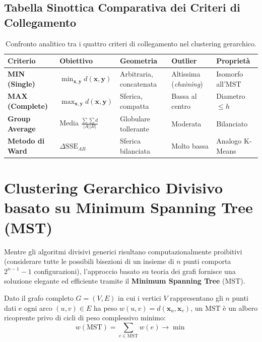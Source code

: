 \FloatBarrier
\subsection{Tabella Sinottica Comparativa dei Criteri di Collegamento}

\begin{table}[H]
\centering
\footnotesize
\renewcommand{\arraystretch}{1.25}
\begin{tabularx}{\textwidth}{p{2.3cm} p{2.2cm} Y Y Y}
\toprule
\textbf{Criterio} & \textbf{Obiettivo} & \textbf{Geometria} & \textbf{Outlier} & \textbf{Proprietà} \\
\midrule
\textbf{MIN (Single)} & $\min_{\mathbf{x}, \mathbf{y}} d(\mathbf{x}, \mathbf{y})$ & Arbitraria, concatenata & Altissima (\textit{chaining}) & Isomorfo all'$\mathrm{MST}$ \\
\textbf{MAX (Complete)} & $\max_{\mathbf{x}, \mathbf{y}} d(\mathbf{x}, \mathbf{y})$ & Sferica, compatta & Bassa al centro & Diametro $\le h$ \\
\textbf{Group Average} & Media $\frac{\sum \sum d}{|A||B|}$ & Globulare tollerante & Moderata & Bilanciato \\
\textbf{Metodo di Ward} & $\Delta\mathrm{SSE}_{AB}$ & Sferica bilanciata & Molto bassa & Analogo K-Means \\
\bottomrule
\end{tabularx}
\caption{Confronto analitico tra i quattro criteri di collegamento nel clustering gerarchico.}
\label{tab:dm-linkage-criteria-synoptic}
\end{table}

\FloatBarrier
\section{Clustering Gerarchico Divisivo basato su Minimum Spanning Tree (MST)}
\label{sec:dm-divisive-mst-clustering}

Mentre gli algoritmi divisivi generici risultano computazionalmente proibitivi (considerare tutte le possibili bisezioni di un insieme di $n$ punti comporta $2^{n-1} - 1$ configurazioni), l'approccio basato su teoria dei grafi fornisce una soluzione elegante ed efficiente tramite il \textbf{Minimum Spanning Tree} ($\mathrm{MST}$).

\begin{definition}
Dato il grafo completo $G = (V, E)$ in cui i vertici $V$ rappresentano gli $n$ punti dati e ogni arco $(u, v) \in E$ ha peso $w(u, v) = d(\mathbf{x}_u, \mathbf{x}_v)$, un $\mathrm{MST}$ è un albero ricoprente privo di cicli di peso complessivo minimo:
\begin{equation}
    w(\mathrm{MST}) = \sum_{e \in \mathrm{MST}} w(e) \to \min
\end{equation}
\end{definition}


